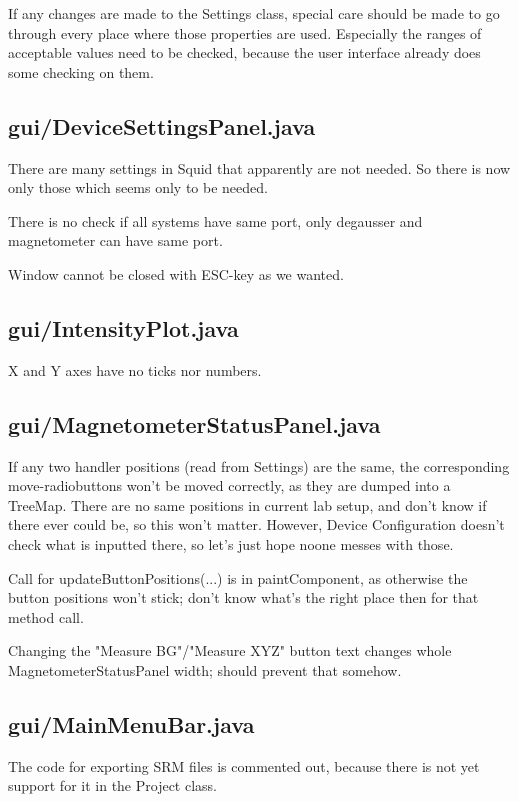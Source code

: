 If any changes are made to the Settings class, special care should be made to go through every place where those properties are used. Especially the ranges of acceptable values need to be checked, because the user interface already does some checking on them.


\subsection{gui/DeviceSettingsPanel.java}

There are many settings in Squid that apparently are not needed. So there is now only those which seems only to be needed.

There is no check if all systems have same port, only degausser and magnetometer can have same port.

Window cannot be closed with ESC-key as we wanted.


\subsection{gui/IntensityPlot.java}

X and Y axes have no ticks nor numbers.


\subsection{gui/MagnetometerStatusPanel.java}

If any two handler positions (read from Settings) are the same, the corresponding move-radiobuttons won't be moved correctly, as they are dumped into a TreeMap. There are no same positions in current lab setup, and don't know if there ever could be, so this won't matter. However, Device Configuration doesn't check what is inputted there, so let's just hope noone messes with those.

Call for updateButtonPositions(...) is in paintComponent, as otherwise the button positions won't stick; don't know what's the right place then for that method call.

Changing the "Measure BG"/"Measure XYZ" button text changes whole MagnetometerStatusPanel width; should prevent that somehow.


\subsection{gui/MainMenuBar.java}

The code for exporting SRM files is commented out, because there is not yet support for it in the Project class.


